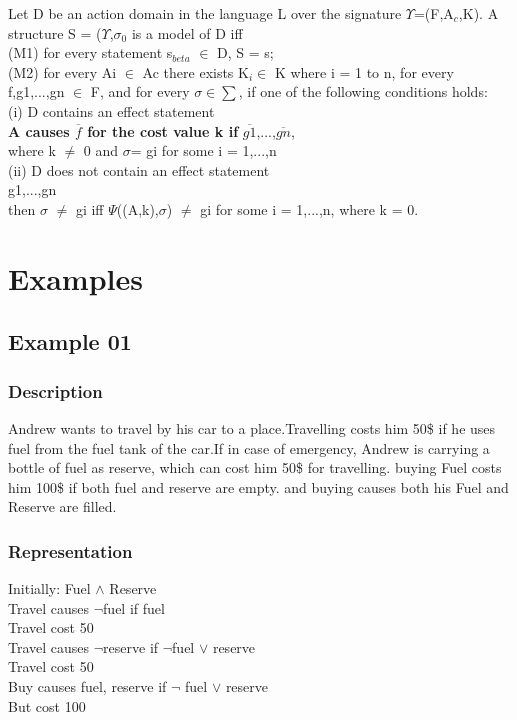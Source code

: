 \documentclass[11pt]{article}
\begin{document}
Let D be an action domain in the language L over the signature $\Upsilon$=(F,A$_{c}$,K). A structure S = ($\Upsilon$,$\sigma_{0}$ is a model of D iff\\
(M1) for every statement s$_{beta}$ $\in$ D, S \textbar= s;\\
(M2) for every Ai $\in$ Ac there exists K$_{i} \in$ K where i = 1 to n, for every f,g1,...,gn $\in$ F, and for every $\sigma\in\sum$, if one of the following conditions holds:
\\\indent
(i) D contains an effect statement\\
\indent\indent 
{\bfseries A causes $\overline{f}$ for the cost value k if} $\overline{g1}$,...,$\overline{gn}$,\\
\indent where k $\neq$ 0 and $\sigma$\textbar=  gi for some i = 1,...,n\\
\indent(ii) D does not contain an effect statement\\
\indent{} g1,...,gn\\
\indent then $\sigma$ \textbar$\neq$ gi iff $\Psi$((A,k),$\sigma$) \textbar$\neq$ gi for some i = 1,...,n, where k = 0.\\

	\section{Examples}\label{sec:Examples}
	\subsection{Example 01}\label{example:ex01}
	\subsubsection{Description}\label{par:p101}
	Andrew wants to travel by his car to a place.Travelling costs him 50\$ if he uses fuel from the fuel tank of the car.If in case of emergency, Andrew is carrying a bottle of fuel as reserve, which can cost him 50\$ for travelling. buying Fuel costs him 100\$ if both fuel and reserve are empty. and buying causes both his Fuel and Reserve are filled. 
	\subsubsection{Representation}\label{par:p201}
	Initially:  Fuel $\wedge$ Reserve \\
	Travel causes $\neg$fuel if fuel \\
	Travel cost 50 \\
	Travel causes $\neg$reserve if $\neg$fuel $\vee$ reserve\\
	Travel cost 50 \\
	Buy causes fuel, reserve  if $\neg$ fuel $\vee$ reserve\\
	But cost 100 \\
\end{document}
